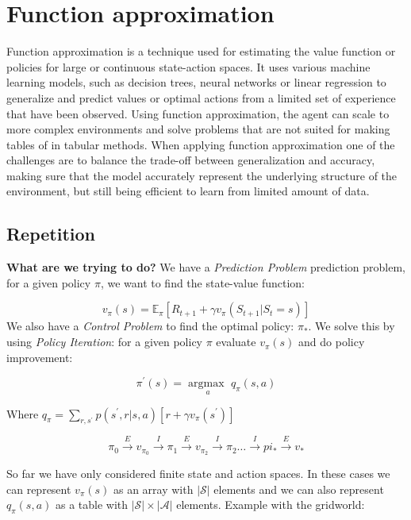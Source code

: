 
\section{Function approximation}
Function approximation is a technique used for estimating the value function or policies for large or continuous state-action spaces. It uses various machine learning models, such as decision trees, neural networks or linear regression to generalize and predict values or optimal actions from a limited set of experience that have been observed. Using function approximation, the agent can scale to more complex environments and solve problems that are not suited for making tables of in tabular methods. When applying function approximation one of the challenges are to balance the trade-off between generalization and accuracy, making sure that the model accurately represent the underlying structure of the environment, but still being efficient to learn from limited amount of data. 

\subsection{Repetition}
\textbf{What are we trying to do?} We have a \emph{Prediction Problem} prediction problem, for a given policy $\pi$, we want to find the state-value function:

	\begin{equation}
		v_\pi(s) = \mathbb{E}_\pi[R_{t+1} + \gamma v_\pi (S_{t+1}|S_t=s)]
	\end{equation}
We also have a \emph{Control Problem} to find the optimal policy: $\pi_*$. We solve this by using \emph{Policy Iteration}: for a given policy $\pi$ evaluate $v_\pi(s)$ and do policy improvement:

	\begin{equation}
		\pi^{\prime}(s) = \underset{a}{\arg \text{max }}q_\pi(s,a)
	\end{equation}

Where $q_\pi = \sum_{r,s^{\prime}}^{}p(s^{\prime},r|s,a) [r + \gamma v_\pi(s^{\prime})] $

	\begin{equation}
		\pi_0 \overset{E}{\rightarrow}v_{\pi_0} \overset{I}{\rightarrow} \pi_1 \overset{E}{\rightarrow} v_{\pi_2} \overset{I}{\rightarrow} \pi_2 \ldots \overset{I}{\rightarrow} pi_* \overset{E}{\rightarrow} v_*	
	\end{equation}

So far we have only considered finite state and action spaces. In these cases we can represent $v_\pi(s)$ as an array with $|\mathcal{S}|$ elements and we can also represent $q_\pi(s,a)$ as a table with $|\mathcal{S}| \times |\mathcal{A}|$ elements. Example with the gridworld:

